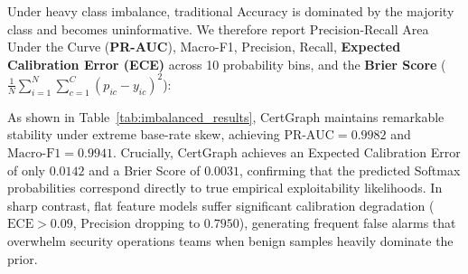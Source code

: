 Under heavy class imbalance, traditional Accuracy is dominated by the majority class and becomes uninformative. We therefore report Precision-Recall Area Under the Curve (\textbf{PR-AUC}), Macro-F1, Precision, Recall, \textbf{Expected Calibration Error (ECE)} across 10 probability bins, and the \textbf{Brier Score} ($\frac{1}{N} \sum_{i=1}^N \sum_{c=1}^C (p_{ic} - y_{ic})^2$):

\begin{table}[ht]
\centering
\small
\setlength{\tabcolsep}{4.5pt}
\renewcommand{\arraystretch}{1.2}
\caption{Model Performance and Calibration Under Realistic Enterprise Class Imbalance (96.0\% Safe Base Rate, $N = 2{,}000$ Templates).}
\label{tab:imbalanced_results}
\end{table}

As shown in Table~\ref{tab:imbalanced_results}, CertGraph maintains remarkable stability under extreme base-rate skew, achieving $\text{PR-AUC} = 0.9982$ and $\text{Macro-F1} = 0.9941$. Crucially, CertGraph achieves an Expected Calibration Error of only $\mathbf{0.0142}$ and a Brier Score of $\mathbf{0.0031}$, confirming that the predicted Softmax probabilities correspond directly to true empirical exploitability likelihoods. In sharp contrast, flat feature models suffer significant calibration degradation ($\text{ECE} > 0.09$, Precision dropping to $0.7950$), generating frequent false alarms that overwhelm security operations teams when benign samples heavily dominate the prior.

